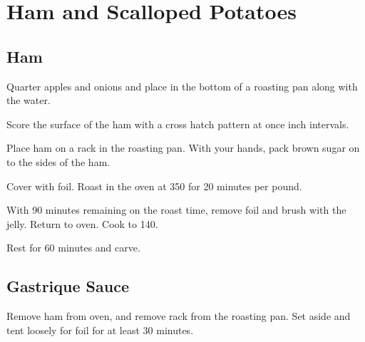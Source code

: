 
\section{Ham and Scalloped Potatoes}
\begin{recipe}


\subsection{Ham}



Quarter apples and onions and place in the bottom of a roasting pan along with the water.

Score the surface of the ham with a cross hatch pattern at once inch intervals.

Place ham on a rack in the roasting pan. With your hands, pack brown sugar on to the sides of the ham.

Cover with foil. Roast in the oven at 350\degree{} for 20 minutes per pound.


With 90 minutes remaining on the roast time, remove foil and brush with the jelly. Return to oven. Cook to 140\degree{}. 

Rest for 60 minutes and carve. 

\subsection{Gastrique Sauce}


Remove ham from oven, and remove rack from the roasting pan. Set aside and tent loosely for foil for at least 30 minutes.


\end{recipe}
